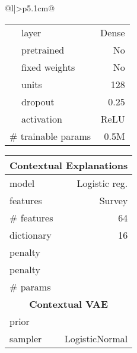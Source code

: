 \documentclass[twoside,11pt]{article}
\begin{document}
\begin{table}[t!]
\begin{tabular}[t]{@{}l|>{\raggedleft\arraybackslash}p{5.1cm}@{}}
\begin{table}[t!]
\begin{subtable}[t]{.52\textwidth}
\begin{tabular}[t]{@{}c|l|r@{}}
        &   layer                           & Dense                     \\
        &   pretrained                      & No                        \\
        &   fixed weights                   & No                        \\
        &   units                           & 128                       \\
        &   dropout                         & 0.25                      \\
        &   activation                      & ReLU                      \\
        \midrule
        \multicolumn{2}{l}{\# trainable params}    &    0.5M            \\
        \bottomrule
    \end{tabular}\hspace{1pt}\setlength\tabcolsep{2pt}
    \begin{tabular}[t]{@{}l|r@{}}
        \toprule
        \multicolumn{2}{c}{\textbf{Contextual Explanations}}            \\
        \midrule
        model                               & Logistic reg.             \\
        features                            & Survey                    \\
        \# features                         & 64                        \\
        dictionary                          & 16                        \\
         penalty                       &          \\
         penalty                       &          \\
        \# params                           &                           \\
        \midrule[.75pt]
        \multicolumn{2}{c}{\textbf{Contextual VAE}}                     \\
        \midrule
        prior                               &        \\
        sampler                             & LogisticNormal            \\
        \bottomrule
    \end{tabular}
\end{subtable}
\end{table}


\end{tabular}
\end{table}
\end{document}
